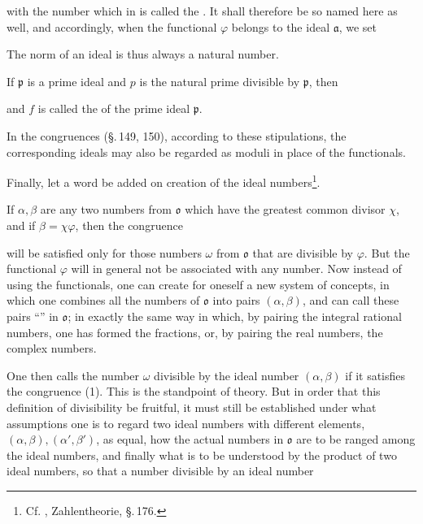 with the number which in  is called the .
It shall therefore be so named here as well, and accordingly,
when the functional $\varphi$ belongs to the ideal $\mathfrak{a}$, we set


The norm of an ideal is thus always a natural number.

If $\mathfrak{p}$ is a prime ideal and $p$ is the natural prime
divisible by $\mathfrak{p}$, then


and $f$ is called the  of the prime ideal $\mathfrak{p}$.

In the congruences (\S.\,149, 150), according to these stipulations,
the corresponding ideals may also be regarded
as moduli in place of the functionals.

Finally, let a word be added on 
creation of the ideal numbers\footnote{Cf. , Zahlentheorie, \S.\,176.}.

If $\alpha, \beta$ are any two numbers from $\mathfrak{o}$ which have the greatest
common divisor $\chi$, and if $\beta = \chi\varphi$, then
the congruence


will be satisfied only for those numbers $\omega$ from $\mathfrak{o}$ that are
divisible by $\varphi$. But the functional $\varphi$ will in general
not be associated with any number. Now instead of using the functionals,
one can create for oneself a new system of concepts, in which
one combines all the numbers of $\mathfrak{o}$ into pairs
$(\alpha, \beta)$, and can call these pairs ``'' in $\mathfrak{o}$;
in exactly the same way in which, by pairing the integral
rational numbers, one has formed the fractions, or, by pairing the real
numbers, the complex numbers.

One then calls the number $\omega$ divisible by the ideal number $(\alpha, \beta)$
if it satisfies the congruence (1). %
This is the standpoint
of  theory. But in order that this definition
of divisibility be fruitful, it must still be established
under what assumptions one is to regard two ideal numbers with
different elements, $(\alpha, \beta), (\alpha', \beta')$, as equal,
how the actual numbers in $\mathfrak{o}$ are to be ranged among the ideal
numbers, and finally what is to be understood by the product of two ideal
numbers, so that a number divisible by an ideal number
